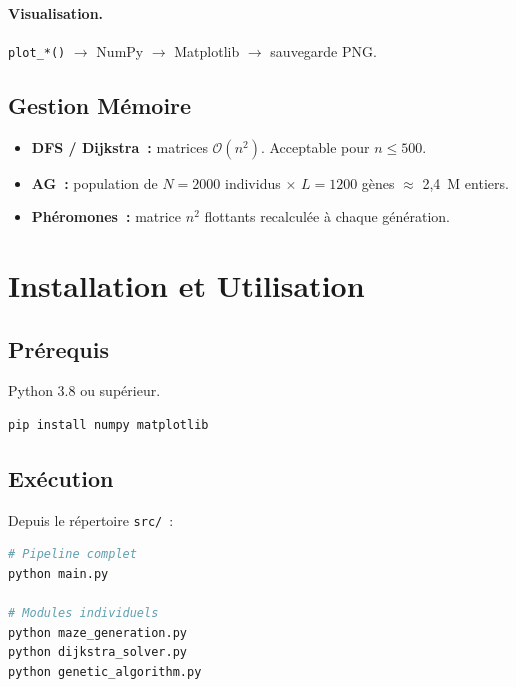 \documentclass[12pt, a4paper]{article}
\theoremstyle{definition}
\theoremstyle{remark}
\newcommand{\bigO}[1]{\mathcal{O}\!\left(#1\right)}
\newcommand{\code}[1]{\texttt{#1}}
\begin{document}
\paragraph{Visualisation.}
\code{plot\_*()} $\rightarrow$ NumPy $\rightarrow$ Matplotlib $\rightarrow$ sauvegarde PNG.

\subsection{Gestion Mémoire}

\begin{itemize}
    \item \textbf{DFS / Dijkstra~:} matrices $\bigO{n^2}$. Acceptable pour $n \leq 500$.
    \item \textbf{AG~:} population de $N = 2000$ individus $\times$ $L = 1200$ gènes
          $\approx$ 2,4~M entiers.
    \item \textbf{Phéromones~:} matrice $n^2$ flottants recalculée à chaque génération.
\end{itemize}

\section{Installation et Utilisation}

\subsection{Prérequis}

Python 3.8 ou supérieur.

\begin{lstlisting}[language=bash]
pip install numpy matplotlib
\end{lstlisting}

\subsection{Exécution}

Depuis le répertoire \code{src/}~:

\begin{lstlisting}[language=bash]
# Pipeline complet
python main.py

# Modules individuels
python maze_generation.py
python dijkstra_solver.py
python genetic_algorithm.py
\end{lstlisting}
\end{document}

